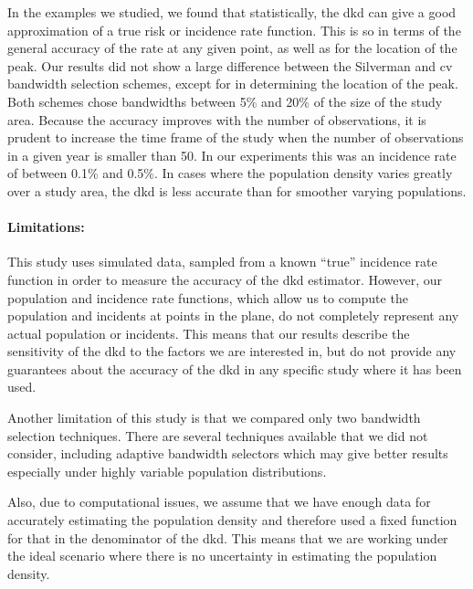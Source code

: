 \begin{onehalfspace}
In the examples we studied,
we found that statistically,
the \acrlong{dkd} can give a good approximation of a true risk or incidence rate function.
This is so in terms of the general accuracy of the rate at any given point,
as well as for the location of the peak.
Our results did not show a large difference between the Silverman and \acrlong{cv} bandwidth selection schemes,
except for in determining the location of the peak.
Both schemes chose bandwidths between 5\% and 20\% of the size of the study area.
Because the accuracy improves with the number of observations,
it is prudent to increase the time frame of the study when the number of observations in a given year is smaller than 50.
In our experiments this was an incidence rate of between 0.1\% and 0.5\%.
In cases where the population density varies greatly over a study area,
the \acrlong{dkd} is less accurate than for smoother varying populations.

\paragraph*{Limitations:}

This study uses simulated data,
sampled from a known ``true'' incidence rate function in order to measure the accuracy of the \acrlong{dkd} estimator.
However,
our population and incidence rate functions,
which allow us to compute the population and incidents at points in the plane,
do not completely represent any actual population or incidents.
This means that our results describe the sensitivity of the \acrlong{dkd} to the factors we are interested in,
but do not provide any guarantees about the accuracy of the \acrlong{dkd} in any specific study where it has been used.

Another limitation of this study is that we compared only two bandwidth selection techniques.
There are several techniques available that we did not consider,
including adaptive bandwidth selectors which may give better results especially under highly variable population distributions.

Also, due to computational issues,
we assume that we have enough data for accurately estimating the population density and therefore used a fixed function for that in the denominator of the \gls{dkd}.
This means that we are working under the ideal scenario where there is no uncertainty in estimating the population density.


\end{onehalfspace}
